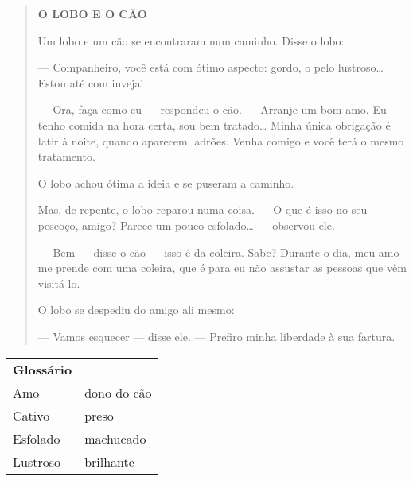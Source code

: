 \begin{quote}
\textbf{O LOBO E O CÃO}

Um lobo e um cão se encontraram num caminho. Disse o lobo:

--- Companheiro, você está com ótimo aspecto: gordo, o pelo
lustroso\ldots{} Estou até com inveja!

--- Ora, faça como eu --- respondeu o cão. --- Arranje um bom amo. Eu
tenho comida na hora certa, sou bem tratado\ldots{} Minha única
obrigação é latir à noite, quando aparecem ladrões. Venha comigo e você
terá o mesmo tratamento.

O lobo achou ótima a ideia e se puseram a caminho.

Mas, de repente, o lobo reparou numa coisa. --- O que é isso no seu
pescoço, amigo? Parece um pouco esfolado\ldots{} --- observou ele.

--- Bem --- disse o cão --- isso é da coleira. Sabe? Durante o dia,
meu amo me prende com uma coleira, que é para eu não assustar as pessoas
que vêm visitá-lo.

O lobo se despediu do amigo ali mesmo:

--- Vamos esquecer --- disse ele. --- Prefiro minha liberdade à sua
fartura.
\end{quote}


\begin{tabular}{ll}
\textbf{Glossário} & \mbox{}\\
Amo & dono do cão\\
Cativo & preso\\
Esfolado & machucado\\
Lustroso & brilhante\\
\end{tabular}

